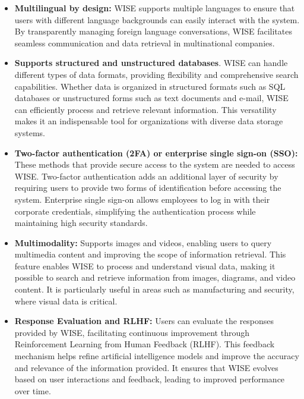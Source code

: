 \begin{itemize}
    \item \textbf{Multilingual by design:} WISE supports multiple languages to ensure that users with different language backgrounds can easily interact with the system. By transparently managing foreign language conversations, WISE facilitates seamless communication and data retrieval in multinational companies.
    
    \item \textbf{Supports structured and unstructured databases}. WISE can handle different types of data formats, providing flexibility and comprehensive search capabilities. Whether data is organized in structured formats such as SQL databases or unstructured forms such as text documents and e-mail, WISE can efficiently process and retrieve relevant information. This versatility makes it an indispensable tool for organizations with diverse data storage systems.
    
    \item \textbf{Two-factor authentication (2FA) or enterprise single sign-on (SSO):} These methods that provide secure access to the system are needed to access WISE. Two-factor authentication adds an additional layer of security by requiring users to provide two forms of identification before accessing the system. Enterprise single sign-on allows employees to log in with their corporate credentials, simplifying the authentication process while maintaining high security standards.
    
    \item \textbf{Multimodality:} Supports images and videos, enabling users to query multimedia content and improving the scope of information retrieval. This feature enables WISE to process and understand visual data, making it possible to search and retrieve information from images, diagrams, and video content. It is particularly useful in areas such as manufacturing and security, where visual data is critical.
    
    \item \textbf{Response Evaluation and RLHF:} Users can evaluate the responses provided by WISE, facilitating continuous improvement through Reinforcement Learning from Human Feedback (RLHF). This feedback mechanism helps refine artificial intelligence models and improve the accuracy and relevance of the information provided. It ensures that WISE evolves based on user interactions and feedback, leading to improved performance over time.
    

\end{itemize}
